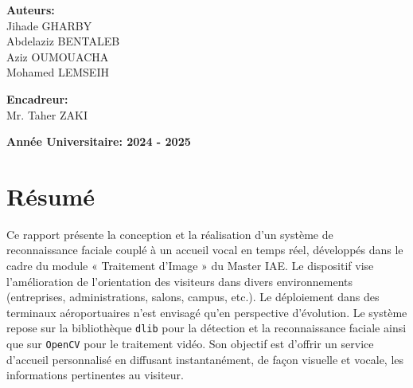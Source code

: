 \documentclass[12pt,a4paper]{article}
\begin{document}
\begin{titlepage}
    \begin{minipage}{0.45\textwidth}
        \centering
        \textbf{\color{primaryblue} Auteurs:}\\
        \vspace{0.3cm}
        {\large Jihade GHARBY}\\
        \vspace{0.2cm}
        {\large Abdelaziz BENTALEB }\\
        \vspace{0.2cm}
        {\large Aziz OUMOUACHA }\\
        \vspace{0.2cm}
        {\large Mohamed LEMSEIH}
    \end{minipage}
    \hfill
    \begin{minipage}{0.45\textwidth}
        \centering
        \textbf{\color{primaryblue} Encadreur:}\\
        \vspace{0.3cm}
        {\large Mr. Taher ZAKI}
    \end{minipage}
    
    \vfill
    
    \begin{tcolorbox}[colback=accentgreen!10, colframe=accentgreen, width=0.6\textwidth, arc=3mm]
        \centering
        {\large\bfseries\color{accentgreen} Année Universitaire: 2024 - 2025}
    \end{tcolorbox}
    
\end{titlepage}

\newpage

\section*{Résumé}

Ce rapport présente la conception et la réalisation d’un système de reconnaissance faciale couplé à un accueil vocal en temps réel, développés dans le cadre du module « Traitement d’Image » du Master IAE. Le dispositif vise l’amélioration de l’orientation des visiteurs dans divers environnements (entreprises, administrations, salons, campus, etc.). Le déploiement dans des terminaux aéroportuaires n’est envisagé qu’en perspective d’évolution. Le système repose sur la bibliothèque \texttt{dlib} pour la détection et la reconnaissance faciale ainsi que sur \texttt{OpenCV} pour le traitement vidéo. Son objectif est d’offrir un service d’accueil personnalisé en diffusant instantanément, de façon visuelle et vocale, les informations pertinentes au visiteur.
\end{document}
